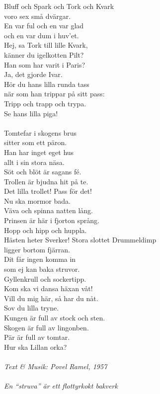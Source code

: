 \vspace{10pt}
Bluff och Spark och Tork och Kvark\\
voro sex små dvärgar.\\
En var ful och en var glad \\
och en var dum i huv'et.\\
Hej, sa Tork till lille Kvark,\\
känner du igelkotten Pilt?\\
Han som har varit i Paris?\\
Ja, det gjorde Ivar.\\
Hör du hans lilla runda tass\\
när som han trippar på sitt pass:\\
Tripp och trapp och trypa.\\
Se hans lilla piga!\\
\\
Tomtefar i skogens brus\\
sitter som ett päron.\\
Han har inget eget hus \\
allt i sin stora näsa.\\
Söt och blöt är sagans fé.\\
Trollen är bjudna hit på te.\\
Det lilla trollet! Pass för det!\\
Nu ska mormor bada.\\
Väva och spinna natten lång.\\
Prinsen är här i fjorton språng.\\
Hopp och hipp och huppla.\\
Hästen heter Sverker!
\newpage
Stora slottet Drummeldimp\\
ligger bortom fjärran.\\
Dit får ingen komma in\\
som ej kan baka struvor.\\
Gyllenkrull och sockertipp.\\
Kom ska vi dansa häxan våt!\\
Vill du mig här, så har du nåt.\\
Sov du lilla tryne.\\
Kungen är full av stock och sten.\\
Skogen är full av lingonben.\\
Pär är full av tomtar.\\
Hur ska Lillan orka?\\
\\
{\footnotesize\textit{Text \& Musik: Povel Ramel, 1957\\ \\ En
    ``struva'' är ett flottyrkokt bakverk}}
